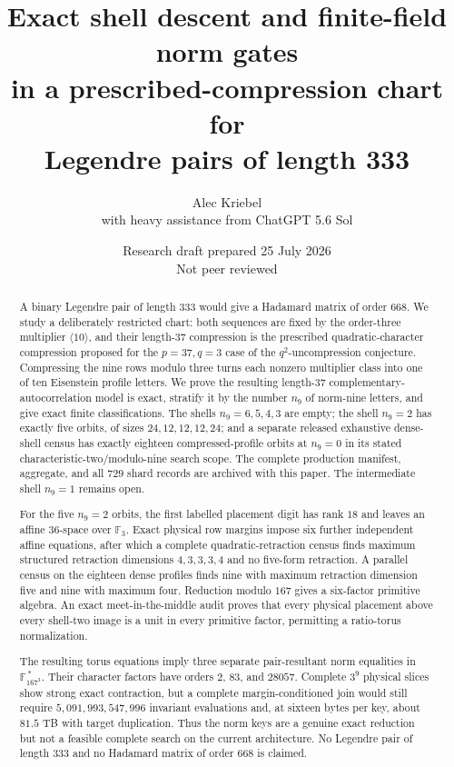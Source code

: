 \documentclass[11pt]{article}
\title{Exact shell descent and finite-field norm gates\\
in a prescribed-compression chart for\\
Legendre pairs of length 333}
\author{Alec Kriebel\\[2pt]\large with heavy assistance from ChatGPT 5.6 Sol}
\date{Research draft prepared 25 July 2026\\Not peer reviewed}
\theoremstyle{remark}
\newcommand{\F}{\mathbb F}
\begin{document}
\maketitle

\begin{abstract}
A binary Legendre pair of length $333$ would give a Hadamard matrix of
order $668$.  We study a deliberately restricted chart: both sequences are
fixed by the order-three multiplier $\langle10\rangle$, and their
length-$37$ compression is the prescribed quadratic-character compression
proposed for the $p=37,q=3$ case of the $q^2$-uncompression conjecture.
Compressing the nine rows modulo three turns each nonzero multiplier class
into one of ten Eisenstein profile letters.  We prove the resulting
length-$37$ complementary-autocorrelation model is exact, stratify it by
the number $n_9$ of norm-nine letters, and give exact finite classifications.
The shells $n_9=6,5,4,3$ are empty; the shell $n_9=2$ has exactly five
orbits, of sizes $24,12,12,12,24$; and a separate released exhaustive
dense-shell census has exactly eighteen compressed-profile orbits at
$n_9=0$ in its stated characteristic-two/modulo-nine search scope.  The
complete production manifest, aggregate, and all $729$ shard records are
archived with this paper.  The intermediate shell $n_9=1$ remains open.

For the five $n_9=2$ orbits, the first labelled placement digit has rank
$18$ and leaves an affine $36$-space over $\F_3$.  Exact physical row
margins impose six further independent affine equations, after which a
complete quadratic-retraction census finds maximum structured retraction
dimensions $4,3,3,3,4$ and no five-form retraction.  A parallel census on
the eighteen dense profiles finds nine with maximum retraction dimension
five and nine with maximum four.  Reduction modulo $167$ gives a six-factor
primitive algebra.  An exact meet-in-the-middle audit proves that every
physical placement above every shell-two image is a unit in every primitive
factor, permitting a ratio-torus normalization.

The resulting torus equations imply three separate pair-resultant norm
equalities in $\F_{167^3}^{\,*}$.  Their character factors have orders
$2$, $83$, and $28057$.  Complete $3^9$ physical slices show strong exact
contraction, but a complete margin-conditioned join would still require
$5{,}091{,}993{,}547{,}996$ invariant evaluations and, at sixteen bytes per
key, about $81.5$ TB with target duplication.  Thus the norm keys are a
genuine exact reduction but not a feasible complete search on the current
architecture.  No Legendre pair of length $333$ and no Hadamard matrix of
order $668$ is claimed.
\end{abstract}
\end{document}
